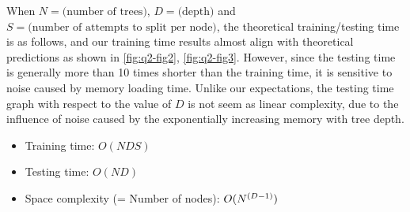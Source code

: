\noindent
When $N = \text{(number of trees)}$, $D = \text{(depth)}$ and $S = \text{(number of attempts to split per node)}$, the theoretical training/testing time is as follows, and our training time results almost align with theoretical predictions as shown in \cref{fig:q2-fig2}, \cref{fig:q2-fig3}. However, since the testing time is generally more than 10 times shorter than the training time, it is sensitive to noise caused by memory loading time. Unlike our expectations, the testing time graph with respect to the value of $D$ is not seem as linear complexity, due to the influence of noise caused by the exponentially increasing memory with tree depth.

\begin{itemize}
	\item Training time: $O(NDS)$
	\item Testing time: $O(ND)$
	\item Space complexity (= Number of nodes): $O(N \time 2^{(D-1)})$
\end{itemize}

